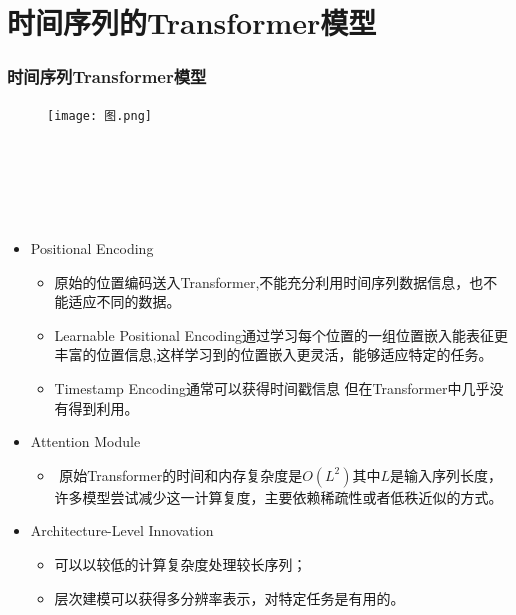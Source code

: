 \documentclass[10pt,t,handout]{beamer}
\begin{document}
\section{时间序列的Transformer模型}
 \begin{frame}
 \frametitle{时间序列Transformer模型}	
  	\begin{figure}
  	\centering
  	\texttt{[image: 图.png]}	~~~~
 
  \end{figure}
  
 \end{frame}
\begin{frame}

\

\

{ }

\
 
	\begin{itemize}
		\item<1-> Positional Encoding
		\begin{itemize}
			\item<1-> 原始的位置编码送入Transformer,不能充分利用时间序列数据信息，也不能适应不同的数据。 
			\item<1-> Learnable Positional Encoding通过学习每个位置的一组位置嵌入能表征更丰富的位置信息,这样学习到的位置嵌入更灵活，能够适应特定的任务。
			\item<1->Timestamp Encoding通常可以获得时间戳信息 但在Transformer中几乎没有得到利用。 
			
		\end{itemize}
		\item<2-> Attention Module
		\begin{itemize}
			\item<2->  原始Transformer的时间和内存复杂度是$O(L^2)$其中$L$是输入序列长度，许多模型尝试减少这一计算复度，主要依赖稀疏性或者低秩近似的方式。
		\end{itemize}
		\item<3-> Architecture-Level Innovation
	\begin{itemize}
		\item<3-> 可以以较低的计算复杂度处理较长序列； 
		\item<3-> 层次建模可以获得多分辨率表示，对特定任务是有用的。 
		
	\end{itemize}
	\end{itemize}

\end{frame}
\end{document}
